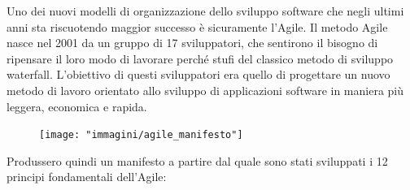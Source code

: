 Uno dei nuovi modelli di organizzazione dello sviluppo software che negli ultimi anni sta riscuotendo maggior successo è sicuramente l’Agile. Il metodo Agile nasce nel 2001 da un gruppo di 17 sviluppatori, che sentirono il bisogno di ripensare il loro modo di lavorare perché stufi del classico metodo di sviluppo waterfall. 
L'obiettivo di questi sviluppatori era quello di progettare un nuovo metodo di lavoro orientato allo sviluppo di applicazioni software in maniera più leggera, economica e rapida. 




\begin{figure}[h!]
	\centering
	\texttt{[image: "immagini/agile\_manifesto"]}
\end{figure}

Produssero quindi un manifesto a partire dal quale sono stati sviluppati i 12 principi fondamentali dell'Agile:

